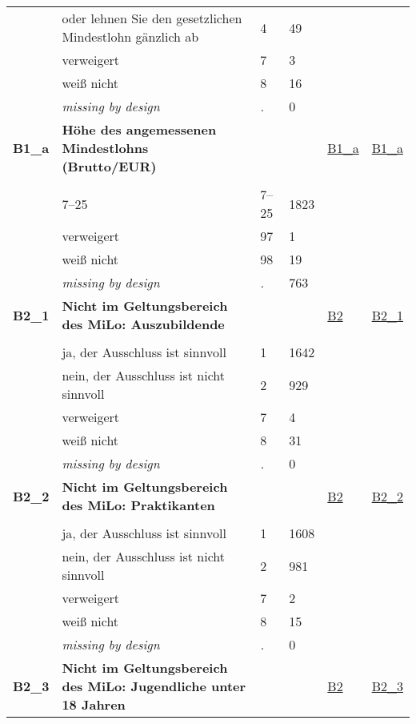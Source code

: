 \begin{longtable}{| L{2.45cm} | L{6cm} | C{1.5cm} | R{1cm} | C{2.25cm} | C{2.25cm} |}
   & oder lehnen Sie den gesetzlichen Mindestlohn gänzlich ab & 4 & 49 &  &  \\ 
   & verweigert & 7 & 3 &  &  \\ 
   & weiß nicht & 8 & 16 &  &  \\ 
   & \textit{missing by design} & \textit{.} & 0 &  &  \\ 
   \midrule
\textbf{B1\_a}\label{var:B1:a} & \textbf{Höhe des angemessenen Mindestlohns (Brutto/EUR)} &  &  & \hyperref[B1:a]{B1\_a} & \hyperref[var:suf:B1:a]{B1\_a} \\ 
   &  &  &  &  &  \\ 
   & 7--25 & 7--25 & 1823 &  &  \\ 
   & verweigert & 97 & 1 &  &  \\ 
   & weiß nicht & 98 & 19 &  &  \\ 
   & \textit{missing by design} & \textit{.} & 763 &  &  \\ 
   \midrule
\textbf{B2\_1}\label{var:B2:1} & \textbf{Nicht im Geltungsbereich des MiLo: Auszubildende} &  &  & \hyperref[B2]{B2} & \hyperref[var:suf:B2:1]{B2\_1} \\ 
   &  &  &  &  &  \\ 
   & ja, der Ausschluss ist sinnvoll & 1 & 1642 &  &  \\ 
   & nein, der Ausschluss ist nicht sinnvoll & 2 & 929 &  &  \\ 
   & verweigert & 7 & 4 &  &  \\ 
   & weiß nicht & 8 & 31 &  &  \\ 
   & \textit{missing by design} & \textit{.} & 0 &  &  \\ 
   \midrule
\textbf{B2\_2}\label{var:B2:2} & \textbf{Nicht im Geltungsbereich des MiLo: Praktikanten} &  &  & \hyperref[B2]{B2} & \hyperref[var:suf:B2:2]{B2\_2} \\ 
   &  &  &  &  &  \\ 
   & ja, der Ausschluss ist sinnvoll & 1 & 1608 &  &  \\ 
   & nein, der Ausschluss ist nicht sinnvoll & 2 & 981 &  &  \\ 
   & verweigert & 7 & 2 &  &  \\ 
   & weiß nicht & 8 & 15 &  &  \\ 
   & \textit{missing by design} & \textit{.} & 0 &  &  \\ 
   \midrule
\textbf{B2\_3}\label{var:B2:3} & \textbf{Nicht im Geltungsbereich des MiLo: Jugendliche unter 18 Jahren} &  &  & \hyperref[B2]{B2} & \hyperref[var:suf:B2:3]{B2\_3} \\ 

\end{longtable}
